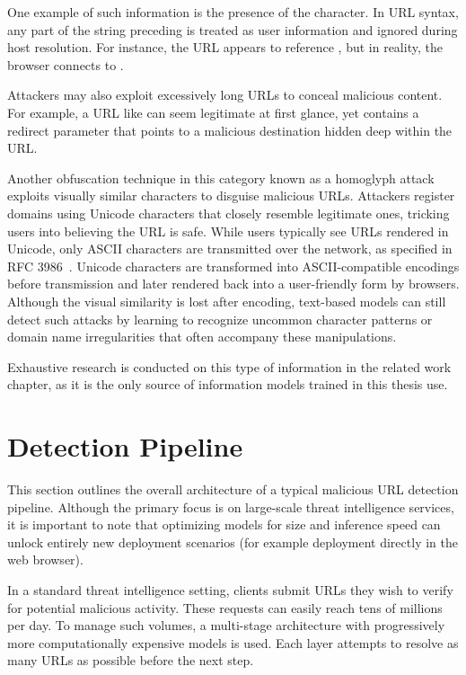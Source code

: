 One example of such information is the presence of the  character. In URL syntax, any part of the string preceding  is treated as user information and ignored during host resolution. For instance, the URL  appears to reference , but in reality, the browser connects to .

Attackers may also exploit excessively long URLs to conceal malicious content. For example, a URL like  can seem legitimate at first glance, yet contains a redirect parameter that points to a malicious destination hidden deep within the URL.

Another obfuscation technique in this category known as a homoglyph attack exploits visually similar characters to disguise malicious URLs. Attackers register domains using Unicode characters that closely resemble legitimate ones, tricking users into believing the URL is safe. While users typically see URLs rendered in Unicode, only ASCII characters are transmitted over the network, as specified in RFC 3986~\cite{rfc3986}. Unicode characters are transformed into ASCII-compatible encodings before transmission and later rendered back into a user-friendly form by browsers. Although the visual similarity is lost after encoding, text-based models can still detect such attacks by learning to recognize uncommon character patterns or domain name irregularities that often accompany these manipulations.

Exhaustive research is conducted on this type of information in the related work chapter, as it is the only source of information models trained in this thesis use.

\section{Detection Pipeline}
\label{sec:real_world_pipeline}
This section outlines the overall architecture of a typical malicious URL detection pipeline. Although the primary focus is on large-scale threat intelligence services, it is important to note that optimizing models for size and inference speed can unlock entirely new deployment scenarios (for example deployment directly in the web browser).

In a standard threat intelligence setting, clients submit URLs they wish to verify for potential malicious activity. These requests can easily reach tens of millions per day. To manage such volumes, a multi-stage architecture with progressively more computationally expensive models is used. Each layer attempts to resolve as many URLs as possible before the next step.

